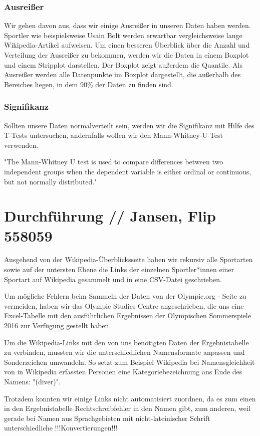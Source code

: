 \documentclass[11pt]{article}
\begin{document}
\subsubsection{Ausreißer}
Wir gehen davon aus, dass wir einige Ausreißer in unseren Daten haben werden. Sportler wie beispielsweise Usain Bolt werden erwartbar vergleichsweise lange Wikipedia-Artikel aufweisen. Um einen besseren Überblick über die Anzahl und Verteilung der Ausreißer zu bekommen, werden wir die Daten in einem Boxplot und einem Stripplot darstellen. Der Boxplot zeigt außerdem die Quantile. Als Ausreißer werden alle Datenpunkte im Boxplot dargestellt, die außerhalb des Bereiches liegen, in dem 90\% der Daten zu finden sind.

\subsubsection{Signifikanz}
Sollten unsere Daten normalverteilt sein, werden wir die Signifikanz mit Hilfe des T-Tests untersuchen, andernfalls wollen wir den Mann-Whitney-U-Test verwenden. 

"The Mann-Whitney U test is used to compare differences between two independent groups when the dependent variable is either ordinal or continuous, but not normally distributed." \parencite{LundResearchLtd}


\section {Durchführung // Jansen, Flip 558059}
Ausgehend von der Wikipedia-Überblicksseite \cite{wikiOlympicComp}haben wir rekursiv alle Sportarten sowie auf der untersten Ebene die Links der einzelnen Sportler*innen einer Sportart auf Wikipedia gesammelt und in eine CSV-Datei geschrieben. 

Um mögliche Fehlern beim Sammeln der Daten von der Olympic.org - Seite zu vermeiden, haben wir das Olympic Studies Centre angeschrieben, die uns eine Excel-Tabelle mit den ausführlichen Ergebnissen der Olympischen Sommerspiele 2016 zur Verfügung gestellt haben.

Um die Wikipedia-Links mit den von uns benötigten Daten der Ergebnistabelle zu verbinden, mussten wir die unterschiedlichen Namensformate anpassen und Sonderzeichen umwandeln. So setzt zum Beispiel Wikipedia bei Namensgleichheit von in Wikipedia erfassten Personen eine Kategoriebezeichnung ans Ende des Namens: "(diver)".

Trotzdem konnten wir einige Links nicht automatisiert zuordnen, da es zum einen in den Ergebnistabelle Rechtschreibfehler in den Namen gibt, zum anderen, weil gerade bei Namen aus Sprachgebieten mit nicht-lateinischer Schrift unterschiedliche !!!Konvertierungen!!!
\end{document}

